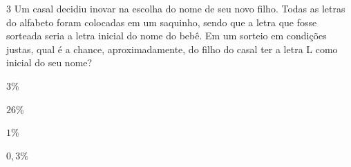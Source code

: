 







\num{3} Um casal decidiu inovar na escolha do nome de seu novo filho. Todas
as letras do alfabeto foram colocadas em um saquinho, sendo que a letra
que fosse sorteada seria a letra inicial do nome do bebê. Em um sorteio
em condições justas, qual é a chance, aproximadamente, do filho do casal
ter a letra L como inicial do seu nome?

\begin{escolha}[itemsep=0pt]
\item $3\%$
\item $26\%$
\item $1\%$
\item $0,3\%$
\end{escolha}







